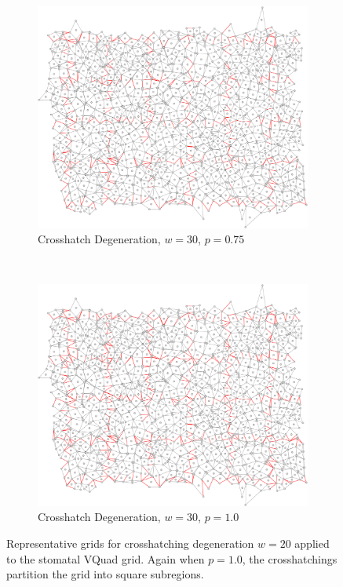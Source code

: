 \documentclass[a4paper,11pt]{article}
\begin{document}
\begin{figure}[htp]
\begin{subfigure}[t]{0.45\textwidth}
  \end{subfigure}

\begin{subfigure}[t]{0.45\textwidth}
  \centering
  \includegraphics[width=\textwidth]{ch6_figs/cross_hatch_p75_w30}
  \caption{Crosshatch Degeneration, $w=30$, $p=0.75$}

  \end{subfigure}
~
\begin{subfigure}[t]{0.45\textwidth}
  \centering
  \includegraphics[width=\textwidth]{ch6_figs/cross_hatch_p100_w30}
  \caption{Crosshatch Degeneration, $w=30$, $p=1.0$}

  \end{subfigure}

\caption[Crosshatch Degeneration, $w=30$]{
  Representative grids for crosshatching degeneration $w=20$ applied to the stomatal VQuad grid. Again when $p=1.0$, the crosshatchings partition the grid into square subregions.
}
\label{fig:ch_w30_grid}
\end{figure}
\end{document}
